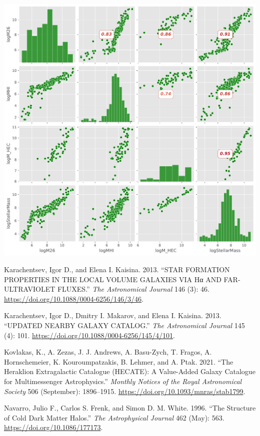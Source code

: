 \documentclass[
]{article}
\newlength{\cslhangindent}
\newenvironment{CSLReferences}[2] %
 {\begin{list}{}{%
  \setlength{\itemindent}{0pt}
  \setlength{\leftmargin}{0pt}
  \setlength{\parsep}{0pt}
  \ifodd #1
   \setlength{\leftmargin}{\cslhangindent}
   \setlength{\itemindent}{-1\cslhangindent}
  \fi
  \setlength{\itemsep}{#2\baselineskip}}}
 {\end{list}}
\begin{document}
\includegraphics{compare_files/figure-pdf/cell-48-output-1.pdf}

\label{refs}
\begin{CSLReferences}{1}{0}
Karachentsev, Igor D., and Elena I. Kaisina. 2013. {``{STAR FORMATION
PROPERTIES IN THE LOCAL VOLUME GALAXIES VIA Hα AND FAR-ULTRAVIOLET
FLUXES}.''} \emph{The Astronomical Journal} 146 (3): 46.
\url{https://doi.org/10.1088/0004-6256/146/3/46}.

Karachentsev, Igor D., Dmitry I. Makarov, and Elena I. Kaisina. 2013.
{``{UPDATED NEARBY GALAXY CATALOG}.''} \emph{The Astronomical Journal}
145 (4): 101. \url{https://doi.org/10.1088/0004-6256/145/4/101}.

Kovlakas, K., A. Zezas, J. J. Andrews, A. Basu-Zych, T. Fragos, A.
Hornschemeier, K. Kouroumpatzakis, B. Lehmer, and A. Ptak. 2021. {``The
{Heraklion Extragalactic Catalogue} ({HECATE}): A Value-Added Galaxy
Catalogue for Multimessenger Astrophysics.''} \emph{Monthly Notices of
the Royal Astronomical Society} 506 (September): 1896--1915.
\url{https://doi.org/10.1093/mnras/stab1799}.

Navarro, Julio F., Carlos S. Frenk, and Simon D. M. White. 1996. {``The
{Structure} of {Cold Dark Matter Halos}.''} \emph{The Astrophysical
Journal} 462 (May): 563. \url{https://doi.org/10.1086/177173}.

\end{CSLReferences}
\end{document}
